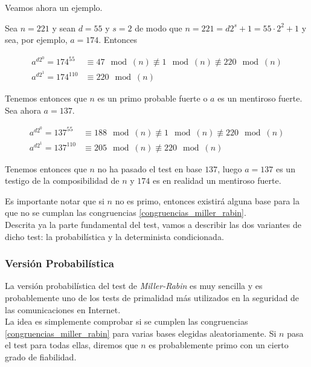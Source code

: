 Veamos ahora un ejemplo.

\begin{ejemplo}
	Sea $n = 221$ y sean $d = 55$ y $s = 2$ de modo que $n = 221 = d2^s + 1 = 55\cdot2^2 + 1$ y sea, por ejemplo, $a = 174$. Entonces
	
	\begin{align}
	a^{d2^0} = 174^{55} &\equiv 47 \mod(n) \not\equiv 1 \mod(n) \not\equiv 220 \mod(n)\\
	a^{d2^1} = 174^{110} &\equiv 220 \mod(n)
	\end{align}
	
	Tenemos entonces que $n$ es un primo probable fuerte o $a$ es un mentiroso fuerte. Sea ahora $a = 137$.
	
	\begin{align}
	a^{d2^0} = 137^{55} &\equiv 188 \mod(n) \not\equiv 1 \mod(n) \not\equiv 220 \mod(n)\\
	a^{d2^1} = 137^{110} &\equiv 205 \mod(n) \not\equiv 220 \mod(n)
	\end{align}
	
	Tenemos entonces que $n$ no ha pasado el test en base $137$, luego $a = 137$ es un testigo de la composibilidad de $n$ y $174$ es en realidad un mentiroso fuerte.
\end{ejemplo}

Es importante notar que si $n$ no es primo, entonces existirá alguna base para la que no se cumplan las congruencias \eqref{congruencias_miller_rabin}.\\

Descrita ya la parte fundamental del test, vamos a describir las dos variantes de dicho test: la probabilística y la determinista condicionada.

\subsubsection{Versión Probabilística}

La versión probabilística del test de \textit{Miller-Rabin} es muy sencilla y es probablemente uno de los tests de primalidad más utilizados en la seguridad de las comunicaciones en Internet.\\

La idea es simplemente comprobar si se cumplen las congruencias \eqref{congruencias_miller_rabin} para varias bases elegidas aleatoriamente. Si $n$ pasa el test para todas ellas, diremos que $n$ es probablemente primo con un cierto grado de fiabilidad.\\


